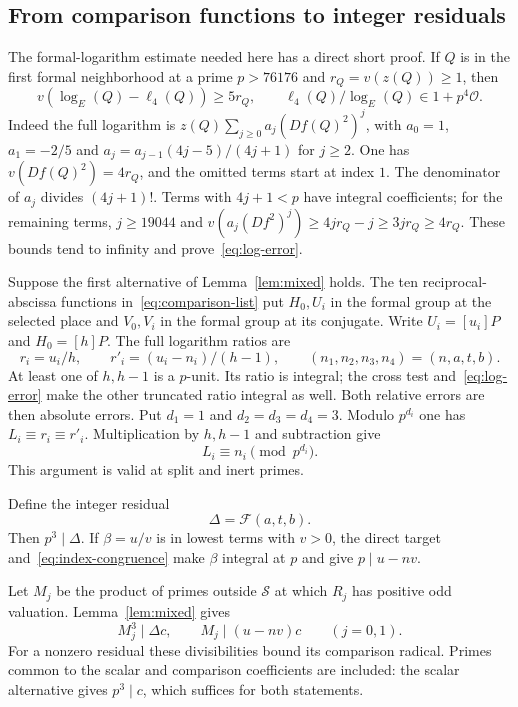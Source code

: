 \documentclass[11pt,a4paper]{article}
\begin{document}
\subsection{From comparison functions to integer residuals}

The formal-logarithm estimate needed here has a direct short proof.
If $Q$ is in the first formal neighborhood at a prime
$p>76176$ and $r_Q=v(z(Q))\ge1$, then
\begin{equation}\label{eq:log-error}
 v(\log_E(Q)-\ell_4(Q))\ge5r_Q,
 \qquad \ell_4(Q)/\log_E(Q)\in1+p^{4}\mathcal O.
\end{equation}
Indeed the full logarithm is
$z(Q)\sum_{j\ge0}a_j(Df(Q)^2)^j$, with
$a_0=1$, $a_1=-2/5$ and
$a_j=a_{j-1}(4j-5)/(4j+1)$ for $j\ge2$.
One has $v(Df(Q)^2)=4r_Q$, and the omitted terms start at index
$1$. The denominator of $a_j$ divides $(4j+1)!$. Terms with
$4j+1<p$ have integral coefficients; for the remaining terms,
$j\ge19044$ and
$v(a_j(Df^2)^j)\ge4jr_Q-j\ge3jr_Q\ge4r_Q$.
These bounds tend to infinity and prove~\eqref{eq:log-error}.

Suppose the first alternative of Lemma~\ref{lem:mixed} holds.
The ten reciprocal-abscissa functions in~\eqref{eq:comparison-list} put
$H_0,U_i$ in the formal group at the selected place and $V_0,V_i$
in the formal group at its conjugate. Write $U_i=[u_i]P$ and
$H_0=[h]P$. The full logarithm ratios are
\[
 r_i=u_i/h,\qquad r'_i=(u_i-n_i)/(h-1),
 \qquad (n_1,n_2,n_3,n_4)=(n,a,t,b).
\]
At least one of $h,h-1$ is a $p$-unit. Its ratio is integral;
the cross test and~\eqref{eq:log-error} make the other truncated
ratio integral as well. Both relative errors are then absolute
errors. Put $d_1=1$ and $d_2=d_3=d_4=3$. Modulo $p^{d_i}$
one has $L_i\equiv r_i\equiv r'_i$. Multiplication by $h,h-1$
and subtraction give
\begin{equation}\label{eq:index-congruence}
 L_i\equiv n_i\pmod{p^{d_i}}.
\end{equation}
This argument is valid at split and inert primes.

Define the integer residual
\[
 \Delta=\mathcal F(a,t,b).
\]
Then $p^3\mid\Delta$. If $\beta=u/v$ is in lowest terms
with $v>0$, the direct target and~\eqref{eq:index-congruence}
make $\beta$ integral at $p$ and give
$p\mid u-nv$.

Let $M_j$ be the product of primes outside $\mathcal S$ at which
$R_j$ has positive odd valuation. Lemma~\ref{lem:mixed} gives
\begin{equation}\label{eq:residual-divisibility}
          M_j^3\mid\Delta c,\qquad M_j\mid(u-nv)c
                         \qquad(j=0,1).
\end{equation}
For a nonzero residual these divisibilities bound its comparison
radical. Primes common to the scalar and comparison coefficients
are included: the scalar alternative gives $p^3\mid c$, which
suffices for both statements.
\end{document}

